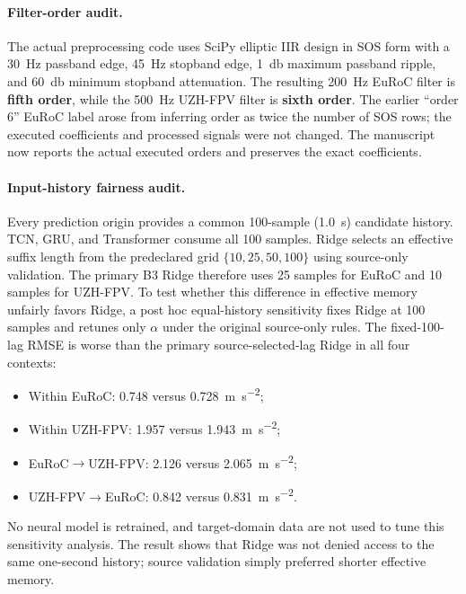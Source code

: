 \documentclass[12pt,a4paper]{article}
\begin{document}
\paragraph{Filter-order audit.}
The actual preprocessing code uses SciPy elliptic IIR design in SOS form with a \SI{30}{\hertz} passband edge, \SI{45}{\hertz} stopband edge, \SI{1}{\decibel} maximum passband ripple, and \SI{60}{\decibel} minimum stopband attenuation. The resulting \SI{200}{\hertz} EuRoC filter is \textbf{fifth order}, while the \SI{500}{\hertz} UZH-FPV filter is \textbf{sixth order}. The earlier ``order 6'' EuRoC label arose from inferring order as twice the number of SOS rows; the executed coefficients and processed signals were not changed. The manuscript now reports the actual executed orders and preserves the exact coefficients.

\paragraph{Input-history fairness audit.}
Every prediction origin provides a common 100-sample (\SI{1.0}{\second}) candidate history. TCN, GRU, and Transformer consume all 100 samples. Ridge selects an effective suffix length from the predeclared grid $\{10,25,50,100\}$ using source-only validation. The primary B3 Ridge therefore uses 25 samples for EuRoC and 10 samples for UZH-FPV. To test whether this difference in effective memory unfairly favors Ridge, a post hoc equal-history sensitivity fixes Ridge at 100 samples and retunes only $\alpha$ under the original source-only rules. The fixed-100-lag RMSE is worse than the primary source-selected-lag Ridge in all four contexts:
\begin{itemize}[leftmargin=*]
    \item Within EuRoC: 0.748 versus 0.728~\si{\metre\per\second\squared};
    \item Within UZH-FPV: 1.957 versus 1.943~\si{\metre\per\second\squared};
    \item EuRoC$\rightarrow$UZH-FPV: 2.126 versus 2.065~\si{\metre\per\second\squared};
    \item UZH-FPV$\rightarrow$EuRoC: 0.842 versus 0.831~\si{\metre\per\second\squared}.
\end{itemize}
No neural model is retrained, and target-domain data are not used to tune this sensitivity analysis. The result shows that Ridge was not denied access to the same one-second history; source validation simply preferred shorter effective memory.
\end{document}
